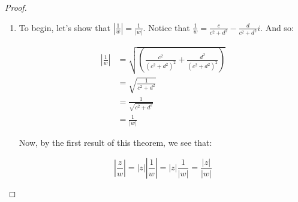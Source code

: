 \begin{proof}
\begin{enumerate}
First, notice that $(ad - bc)^2 \ge 0$. This implies that

$$2abcd \le a^2d^2 + b^2c^2$$

Adding $a^2c^2 + b^2d^2$ to both sides tells us that:

$$(ac + bd)^2 \le (a^2 + b^2)(c^2 + d^2)$$

As such, it follows that $2(ac + bd) \le 2\sqrt{(a^2 + b^2)(c^2 + d^2)}$. Now, adding $a^2 + b^2 + c^2 + d^2$ to both sides gives:

$$(a^2 + 2ac + c^2) + (b^2 + 2bd + d^2) \le (a^2 + b^2) + 2\sqrt{(a^2 + b^2)(c^2 + d^2)} + (c^2 + d^2)$$

Factoring each side gives:

$$(a+c)^2 + (b+d)^2 \le (\sqrt{a^2 + b^2} + \sqrt{c^2 + d^2})^2$$

However, $(a+c)^2 + (b+d)^2 = |z+w|^2$, $\sqrt{a^2 + b^2}= |z|$, and $\sqrt{c^2 + d^2} = |w|$. So we have shown that $|z+w|^2 \le (|z|  +|w|)^2$. Taking the square root of both sides gives $|z +w| \le |z| + |w|$.


For equality, note that if $z = rw$ or $w = rz$ (and you do need either condition, since you could have $z = 0$ or $w = 0$), then $ad - bc = 0$. In that case:

$$2abcd = a^2d^2 + b^2c^2$$

And rather than having $\le$ in our calculations above, equality follows through.

\begin{note}Fisher has a shorter proof of this fact in section 1.2. However, he does not discuss equality.\end{note}


\item To begin, let's show that $\left|\frac{1}{w}\right| = \frac{1}{|w|}$. Notice that $\frac{1}{w} = \frac{c}{c^2 + d^2} - \frac{d}{c^2 + d^2}i$. And so:

\begin{align*}\left|\frac{1}{w}\right| &= \sqrt{\left(\frac{c^2}{(c^2 + d^2)^2} + \frac{d^2}{(c^2 + d^2)^2}\right)} \\
&= \sqrt{\frac{1}{c^2 + d^2}}\\
&= \frac{1}{\sqrt{c^2 + d^2}}\\
&= \frac{1}{|w|}
\end{align*}

Now, by the first result of this theorem, we see that:

$$\left|\frac{z}{w}\right| = |z|\left|\frac{1}{w}\right| = |z|\frac{1}{|w|} = \frac{|z|}{|w|}$$

\end{enumerate}

\end{proof}


